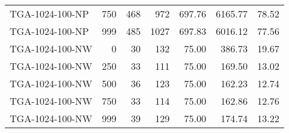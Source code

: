\begin{table}[htbp]
{\begin{tabular}{lrrrrrr}
    TGA-1024-100-NP & 750    & 468    & 972    & 697.76 & 6165.77 & 78.52 \\
    TGA-1024-100-NP & 999    & 485    & 1027   & 697.83 & 6016.12 & 77.56 \\ \hline
    TGA-1024-100-NW & 0      & 30     & 132    & 75.00  & 386.73 & 19.67 \\
    TGA-1024-100-NW & 250    & 33     & 111    & 75.00  & 169.50 & 13.02 \\
    TGA-1024-100-NW & 500    & 36     & 123    & 75.00  & 162.23 & 12.74 \\
    TGA-1024-100-NW & 750    & 33     & 114    & 75.00  & 162.86 & 12.76 \\
    TGA-1024-100-NW & 999    & 39     & 129    & 75.00  & 174.74 & 13.22 \\
    \bottomrule
    \end{tabular}}
  \label{tab:addlabel}%
\end{table}%
